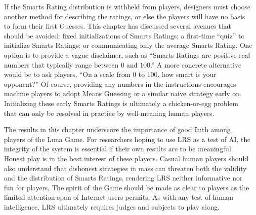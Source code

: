 If the Smarts Rating distribution is withheld from players, designers must choose another method for describing the ratings, or else the players will have no basis to form their first Guesses. This chapter has discussed several avenues that should be avoided: fixed initializations of Smarts Ratings; a first-time ``quiz'' to initialize Smarts Ratings; or communicating only the average Smarts Rating. One option is to provide a vague disclaimer, such as ``Smarts Ratings are positive real numbers that typically range between $0$ and $100$.'' A more concrete alternative would be to ask players, ``On a scale from $0$ to $100$, how smart is your opponent?'' Of course, providing any numbers in the instructions encourages machine players to adopt Means Guessing or a similar naive strategy early on. Initializing these early Smarts Ratings is ultimately a chicken-or-egg problem that can only be resolved in practice by well-meaning human players.

The results in this chapter underscore the importance of good faith among players of the Luna Game. For researchers hoping to use LRS as a test of AI, the integrity of the system is essential if their own results are to be meaningful. Honest play is in the best interest of these players. Casual human players should also understand that dishonest strategies in mass can threaten both the validity and the distribution of Smarts Ratings, rendering LRS neither informative nor fun for players. The spirit of the Game should be made as clear to players as the limited attention span of Internet users permits. As with any test of human intelligence, LRS ultimately requires judges and subjects to play along.

